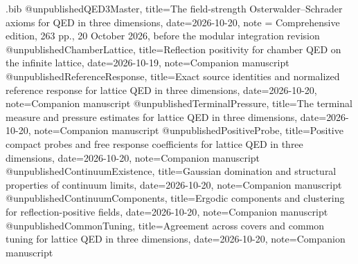 \begin{filecontents*}[overwrite]{\jobname.bib}
@unpublished{QED3Master,
 title={The field-strength {Osterwalder--Schrader} axioms for {QED} in three dimensions},
 date={2026-10-20}, note = {Comprehensive edition, 263 pp., 20 October 2026, before the modular integration revision}}
@unpublished{ChamberLattice,
 title={Reflection positivity for chamber {QED} on the infinite lattice},
 date={2026-10-19}, note={Companion manuscript}}
@unpublished{ReferenceResponse,
 title={Exact source identities and normalized reference response for lattice {QED} in three dimensions},
 date={2026-10-20}, note={Companion manuscript}}
@unpublished{TerminalPressure,
 title={The terminal measure and pressure estimates for lattice {QED} in three dimensions},
 date={2026-10-20}, note={Companion manuscript}}
@unpublished{PositiveProbe,
 title={Positive compact probes and free response coefficients for lattice {QED} in three dimensions},
 date={2026-10-20}, note={Companion manuscript}}
@unpublished{ContinuumExistence,
 title={Gaussian domination and structural properties of continuum limits},
 date={2026-10-20}, note={Companion manuscript}}
@unpublished{ContinuumComponents,
 title={Ergodic components and clustering for reflection-positive fields},
 date={2026-10-20}, note={Companion manuscript}}
@unpublished{CommonTuning,
 title={Agreement across covers and common tuning for lattice {QED} in three dimensions},
 date={2026-10-20}, note={Companion manuscript}}
\end{filecontents*}
\documentclass[11pt,letterpaper,reqno]{amsart}
\makeatletter
{}[2020/10/01]

\RequirePackage[T1]{fontenc}
\RequirePackage{lmodern}
\RequirePackage{microtype}
\RequirePackage[letterpaper,margin=1in,headheight=15pt]{geometry}
\RequirePackage{amsmath,amsthm,amssymb,mathtools}
\RequirePackage{enumitem}
\RequirePackage{perpage}
\RequirePackage{xcolor}
\RequirePackage[breaklinks=true,colorlinks=true,
  linkcolor=manuscriptred,citecolor=manuscriptcyan,urlcolor=manuscriptmagenta]{hyperref}
\RequirePackage{cleveref}

